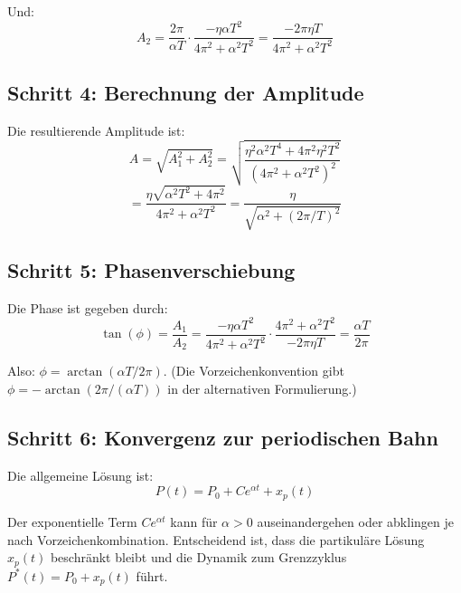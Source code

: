 \documentclass[a4paper, 12pt, twoside, openright]{report}
\theoremstyle{definition}
\theoremstyle{definition}
\begin{document}
Und:
\begin{equation}
    A_2 = \frac{2\pi}{\alpha T} \cdot \frac{-\eta \alpha T^2}{4\pi^2 + \alpha^2 T^2} = \frac{-2\pi \eta T}{4\pi^2 + \alpha^2 T^2}
\end{equation}

\subsection{Schritt 4: Berechnung der Amplitude}

Die resultierende Amplitude ist:
\begin{equation}
    A = \sqrt{A_1^2 + A_2^2} = \sqrt{\frac{\eta^2 \alpha^2 T^4 + 4\pi^2 \eta^2 T^2}{(4\pi^2 + \alpha^2 T^2)^2}}
\end{equation}
\begin{equation}
    = \frac{\eta\sqrt{\alpha^2 T^2 + 4\pi^2}}{4\pi^2 + \alpha^2 T^2} = \frac{\eta}{\sqrt{\alpha^2 + (2\pi/T)^2}}
\end{equation}

\subsection{Schritt 5: Phasenverschiebung}

Die Phase ist gegeben durch:
\begin{equation}
    \tan(\phi) = \frac{A_1}{A_2} = \frac{-\eta \alpha T^2}{4\pi^2 + \alpha^2 T^2} \cdot \frac{4\pi^2 + \alpha^2 T^2}{-2\pi \eta T} = \frac{\alpha T}{2\pi}
\end{equation}

Also: $\phi = \arctan(\alpha T / 2\pi)$. (Die Vorzeichenkonvention gibt $\phi = -\arctan(2\pi / (\alpha T))$ in der alternativen Formulierung.)

\subsection{Schritt 6: Konvergenz zur periodischen Bahn}

Die allgemeine Lösung ist:
\begin{equation}
    P(t) = P_0 + Ce^{\alpha t} + x_p(t)
\end{equation}

Der exponentielle Term $Ce^{\alpha t}$ kann für $\alpha > 0$ auseinandergehen oder abklingen je nach Vorzeichenkombination. Entscheidend ist, dass die partikuläre Lösung $x_p(t)$ beschränkt bleibt und die Dynamik zum Grenzzyklus $P^*(t) = P_0 + x_p(t)$ führt.
\end{document}
